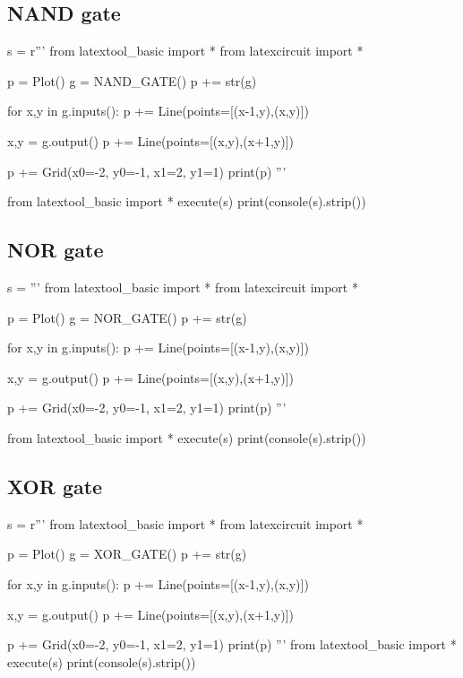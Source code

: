 \newpage
\subsection{NAND gate}

\begin{python}
s = r'''
from latextool_basic import *
from latexcircuit import *

p = Plot()
g = NAND_GATE()
p += str(g)

for x,y in g.inputs():
    p += Line(points=[(x-1,y),(x,y)])

x,y = g.output()
p += Line(points=[(x,y),(x+1,y)])

p += Grid(x0=-2, y0=-1, x1=2, y1=1)
print(p)
'''

from latextool_basic import *
execute(s)
print(console(s).strip())
\end{python}



\newpage
\subsection{NOR gate}
\begin{python}
s = '''
from latextool_basic import *
from latexcircuit import *

p = Plot()
g = NOR_GATE()
p += str(g)

for x,y in g.inputs():
    p += Line(points=[(x-1,y),(x,y)])

x,y = g.output()
p += Line(points=[(x,y),(x+1,y)])

p += Grid(x0=-2, y0=-1, x1=2, y1=1)
print(p)
'''

from latextool_basic import *
execute(s)
print(console(s).strip())
\end{python}



\newpage
\subsection{XOR gate}
\begin{python}
s = r'''
from latextool_basic import *
from latexcircuit import *

p = Plot()
g = XOR_GATE()
p += str(g)

for x,y in g.inputs():
    p += Line(points=[(x-1,y),(x,y)])

x,y = g.output()
p += Line(points=[(x,y),(x+1,y)])

p += Grid(x0=-2, y0=-1, x1=2, y1=1)
print(p)
'''
from latextool_basic import *
execute(s)
print(console(s).strip())
\end{python}


